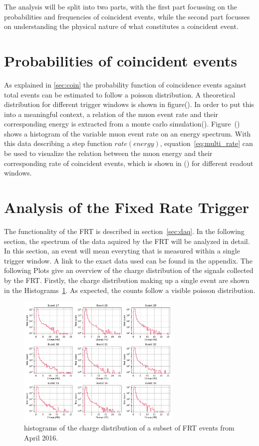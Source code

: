The analysis will be split into two parts, with the first part focussing on the probabilities and frequencies of coincident events, while the second part 
focusses on understanding the physical nature of what constitutes a coincident event. 

\section{Probabilities of coincident events}

As explained in \ref{sec:coin} the probability function of coincidence events against total events can be estimated to follow a poisson distribution.
A theoretical distribution for different trigger windows is shown in figure(). In order to put this into a meaningful context, a relation of the muon event rate and 
their corresponding energy is extracted from a monte carlo simulation(). Figure~() shows a histogram of the variable muon event rate on an energy spectrum. 
With this data describing a step function $rate(energy)$, equation~\ref{eq:multi_rate} can be used to visualize the relation between the muon energy and their 
corresponding rate of coincident events, which is shown in () for different readout windows. 

\section{Analysis of the Fixed Rate Trigger}

The functionality of the FRT is described in section~\ref{sec:daq}. In the following section, the spectrum of the data aquired by the FRT will be analyzed in 
detail. In this section, an event will mean everyting that is measured within a single trigger window. A link to the exact data used can be found 
in the appendix. The following Plots give an overview of the charge distribution of the signals collected by the FRT. Firstly, the charge distribution making up a 
single event are shown in the Histograms~\ref{fig:single_charge_hist}. As expected, the counts follow a visible poisson distribution.

\begin{figure}
    \centering
    \includegraphics[width=0.7\textwidth]{Plots/single_charge_hist.pdf}
    \caption{histograms of the charge distribution of a subset of FRT events from April 2016.}
    \label{fig:single_charge_hist}
\end{figure}


